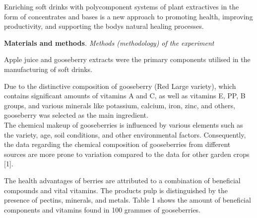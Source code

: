 \begin{multicols}{2}
Enriching soft drinks with polycomponent systems of plant extractives in
the form of concentrates and bases is a new approach to promoting
health, improving productivity, and supporting the
body\textquotesingle s natural healing processes.

{\bfseries Materials and methods}\emph{. Methods (methodology) of the
experiment}

Apple juice and gooseberry extracts were the primary components utilised
in the manufacturing of soft drinks.~

Due to the distinctive composition of gooseberry (Red Large variety),
which contains significant amounts of vitamins A and C, as well as
vitamins E, PP, B groups, and various minerals like potassium, calcium,
iron, zinc, and others, gooseberry was selected as the main
ingredient.~\\
The chemical makeup of gooseberries is influenced by various elements
such as the variety, age, soil conditions, and other environmental
factors. Consequently, the data regarding the chemical composition of
gooseberries from different sources are more prone to variation compared
to the data for other garden crops {[}1{]}.~

The health advantages of berries are attributed to a combination of
beneficial compounds and vital vitamins. The product\textquotesingle s
pulp is distinguished by the presence of pectins, minerals, and metals.
Table 1 shows the amount of beneficial components and vitamins found in
100 grammes of gooseberries.

\end{multicols}

